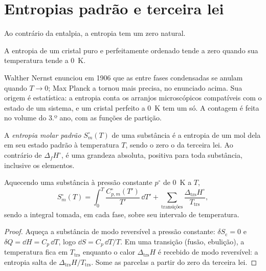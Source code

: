 \section{Entropias padrão e terceira lei}

Ao contrário da entalpia, a entropia tem um zero natural.

\begin{theorem}\label{thm:b2:reaction-free-energy:third-law}
A entropia de um cristal puro e perfeitamente ordenado tende a zero quando
sua temperatura tende a \qty{0}{K}.
\end{theorem}
\admitted

\begin{remark}\label{rem:b2:reaction-free-energy:third-law}
Walther Nernst enunciou em 1906 que as  entre fases
condensadas se anulam quando $T \to 0$; Max Planck a tornou mais precisa,
no enunciado acima. Sua origem é estatística: a entropia conta os arranjos
microscópicos compatíveis com o estado de um sistema, e um cristal perfeito
a \qty{0}{K} tem um só. A contagem é feita no volume do 3.º ano,
com as funções de partição.
\end{remark}

\begin{definition}\label{def:b2:reaction-free-energy:standard-entropy}
A \emph{entropia molar padrão}
$S^\circ_m(T)$ de uma substância é a entropia de um mol dela em seu
estado padrão à temperatura $T$, sendo o zero o da terceira lei.
Ao contrário de $\Delta_f H^\circ$, é uma grandeza absoluta, positiva para
toda substância, inclusive os elementos.
\end{definition}

\begin{proposition}\label{prop:b2:reaction-free-energy:absolute-entropy}
Aquecendo uma substância à pressão constante $p^\circ$ de \qty{0}{K} a $T$,
\[
  S^\circ_m(T) = \int_0^T\frac{C^\circ_{p,m}(T')}{T'}\,\dd T' +
  \sum_{\text{transições}}\frac{\Delta_{\text{trs}}H^\circ}{T_{\text{trs}}} ,
\]
sendo a integral tomada, em cada fase, sobre seu intervalo de temperatura.
\end{proposition}

\begin{proof}
Aqueça a substância de modo reversível a pressão constante: $\delta S_{\text{c}} =
0$ e $\delta Q = \dd H = C_p\,\dd T$, logo $\dd S = C_p\,\dd T/T$. Em uma
transição (fusão, ebulição), a temperatura fica em $T_{\text{trs}}$
enquanto o calor $\Delta_{\text{trs}}H$ é recebido de modo reversível: a
entropia salta de $\Delta_{\text{trs}}H/T_{\text{trs}}$. Some as parcelas a
partir do zero da terceira lei.
\end{proof}

